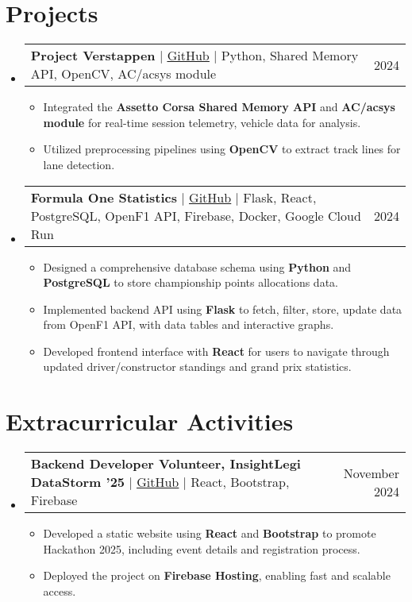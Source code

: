 \documentclass[letterpaper,11pt]{article}
\makeatletter
\newcommand{\resumeItem}[1]{
  \item\small{
    {#1 \vspace{-3pt}}
  }
}
\newcommand{\resumeProjectHeading}[2]{
    \item
    \begin{tabular*}{0.97\textwidth}{l@{\extracolsep{\fill}}r@{\hspace{-0.2in}}}
        \small#1 & \small#2 \\
    \end{tabular*}\vspace{-5pt}
}
\newcommand{\resumeSubHeadingListStart}{\begin{itemize}[leftmargin=0.00in, rightmargin=-0.2in, label={}]}
\newcommand{\resumeSubHeadingListEnd}{\end{itemize}\vspace{-7pt}}
\newcommand{\resumeItemListStart}{\begin{itemize}[leftmargin=0.15in, rightmargin=0.15in]}
\newcommand{\resumeItemListEnd}{\end{itemize}\vspace{-7pt}}
\makeatother
\begin{document}

\section{Projects}
\resumeSubHeadingListStart

\resumeProjectHeading
{\textbf{Project Verstappen} $|$ \href{https://github.com/juhun32/project-verstappen}{\underline{GitHub}} $|$ Python, Shared Memory API, OpenCV, AC/acsys module}{2024}
\resumeItemListStart
\resumeItem{Integrated the \textbf{Assetto Corsa Shared Memory API} and \textbf{AC/acsys module} for real-time session telemetry, vehicle data for analysis.}
\resumeItem{Utilized preprocessing pipelines using \textbf{OpenCV} to extract track lines for lane detection.}
\resumeItemListEnd

\resumeProjectHeading
{\textbf{Formula One Statistics} $|$ \href{https://github.com/juhun32/f1-statistics}{\underline{GitHub}} $|$ Flask, React, PostgreSQL, OpenF1 API, Firebase, Docker, Google Cloud Run}{2024}
\resumeItemListStart
\resumeItem{Designed a comprehensive database schema using \textbf{Python} and \textbf{PostgreSQL} to store championship points allocations data.}
\resumeItem{Implemented backend API using \textbf{Flask} to fetch, filter, store, update data from OpenF1 API, with data tables and interactive graphs.}
\resumeItem{Developed frontend interface with \textbf{React} for users to navigate through updated driver/constructor standings and grand prix statistics.}
\resumeItemListEnd


\resumeSubHeadingListEnd


\section{Extracurricular Activities}
\resumeSubHeadingListStart
\resumeProjectHeading
{\textbf{Backend Developer Volunteer, InsightLegi DataStorm '25} $|$ \href{https://github.com/juhun32/datastorm25}{\underline{GitHub}} $|$ React, Bootstrap, Firebase}{November 2024}
\resumeItemListStart
\resumeItem{Developed a static website using \textbf{React} and \textbf{Bootstrap} to promote Hackathon 2025, including event details and registration process.}
\resumeItem{Deployed the project on \textbf{Firebase Hosting}, enabling fast and scalable access.}
\resumeItemListEnd
\resumeSubHeadingListEnd
\end{document}
